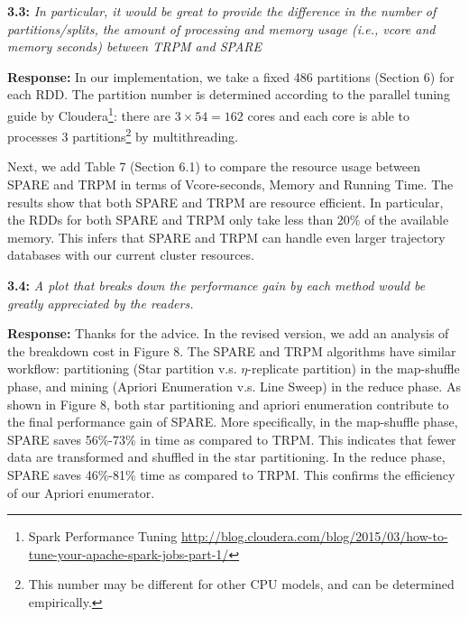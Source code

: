 \documentclass{vldb}
\begin{document}


\textbf{3.3:} \emph{In particular, it would be great to provide the
difference in the number of partitions/splits, the amount of processing and
memory usage (i.e., vcore and memory seconds) between TRPM and SPARE}

\textbf{Response:} In our implementation, we take a fixed 486 partitions (Section 6)
for each RDD. The partition number is determined according to
the parallel tuning guide by Cloudera\footnote{Spark Performance Tuning \url{http://blog.cloudera.com/blog/2015/03/how-to-tune-your-apache-spark-jobs-part-1/}}: there are  $3\times 54=162$ cores and each core is able to processes 3 partitions\footnote{This number may be different for other CPU models, and can be determined empirically.}
by multithreading.

Next, we add Table 7 (Section 6.1) to compare the resource usage between SPARE and TRPM in terms of Vcore-seconds, Memory and Running Time. The results show that both SPARE and TRPM are resource efficient. In particular, the RDDs for both SPARE and TRPM only take less than 20\% of the available memory. This infers that SPARE and TRPM can handle
even larger trajectory databases with our current cluster resources.



\textbf{3.4:} \emph{A plot that breaks down the performance gain by each method would
be greatly appreciated by the readers.}

\textbf{Response:} Thanks for the advice. In the revised version, we add an analysis of
the breakdown cost in Figure 8. The SPARE and TRPM algorithms have similar workflow: partitioning (Star partition v.s. $\eta$-replicate partition) in the map-shuffle phase, and  mining (Apriori Enumeration v.s. Line Sweep) in the reduce phase. %
As shown in Figure 8,
both star partitioning and apriori enumeration contribute to 
the final performance gain of SPARE. More specifically, in the map-shuffle phase,
SPARE saves 56\%-73\% in time as compared to TRPM. This indicates that 
fewer data are transformed and shuffled in the star partitioning.
In the reduce phase, SPARE saves 46\%-81\% time as compared to TRPM. This confirms 
the efficiency of our Apriori enumerator.
\end{document}
